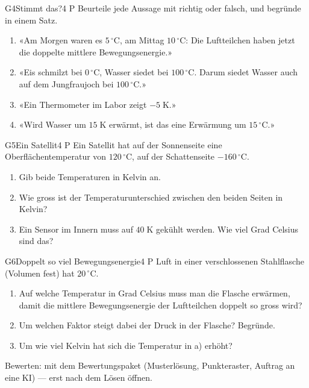 \documentclass[11pt]{article}
\begin{document}
\begin{lpaufgabe}{G4}{Stimmt das?}{4 P}
Beurteile jede Aussage mit richtig oder falsch, und begründe in einem Satz.
\begin{enumerate}[label=\alph*),leftmargin=*,itemsep=2pt,topsep=2pt]
\item «Am Morgen waren es $5\,^\circ\text{C}$, am Mittag $10\,^\circ\text{C}$: Die Luftteilchen haben jetzt die doppelte mittlere Bewegungsenergie.»
\item «Eis schmilzt bei $0\,^\circ\text{C}$, Wasser siedet bei $100\,^\circ\text{C}$. Darum siedet Wasser auch auf dem Jungfraujoch bei $100\,^\circ\text{C}$.»
\item «Ein Thermometer im Labor zeigt $-5\;\text{K}$.»
\item «Wird Wasser um $15\;\text{K}$ erwärmt, ist das eine Erwärmung um $15\,^\circ\text{C}$.»
\end{enumerate}
\end{lpaufgabe}


\begin{lpaufgabe}{G5}{Ein Satellit}{4 P}
Ein Satellit hat auf der Sonnenseite eine Oberflächentemperatur von $120\,^\circ\text{C}$, auf der Schattenseite $-160\,^\circ\text{C}$.
\begin{enumerate}[label=\alph*),leftmargin=*,itemsep=2pt,topsep=2pt]
\item Gib beide Temperaturen in Kelvin an.
\item Wie gross ist der Temperaturunterschied zwischen den beiden Seiten in Kelvin?
\item Ein Sensor im Innern muss auf $40\;\text{K}$ gekühlt werden. Wie viel Grad Celsius sind das?
\end{enumerate}
\end{lpaufgabe}

\begin{lpaufgabe}{G6}{Doppelt so viel Bewegungsenergie}{4 P}
Luft in einer verschlossenen Stahlflasche (Volumen fest) hat $20\,^\circ\text{C}$.
\begin{enumerate}[label=\alph*),leftmargin=*,itemsep=2pt,topsep=2pt]
\item Auf welche Temperatur in Grad Celsius muss man die Flasche erwärmen, damit die mittlere Bewegungsenergie der Luftteilchen doppelt so gross wird?
\item Um welchen Faktor steigt dabei der Druck in der Flasche? Begründe.
\item Um wie viel Kelvin hat sich die Temperatur in a) erhöht?
\end{enumerate}
\end{lpaufgabe}

\vfill
{\small\color{lpgrau}Bewerten: mit dem Bewertungspaket (Musterlösung, Punkteraster, Auftrag an eine KI) — erst nach dem Lösen öffnen.}
\end{document}
